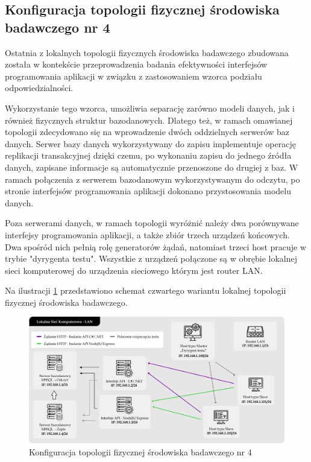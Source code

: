 \subsection*{Konfiguracja topologii fizycznej środowiska badawczego nr 4}
\label{sec:lokalne-srodowisko-badawcze-ver-4}
Ostatnia z lokalnych topologii fizycznych środowiska badawczego zbudowana została w kontekście przeprowadzenia badania efektywności interfejsów programowania aplikacji w związku z zastosowaniem wzorca podziału odpowiedzialności.

Wykorzystanie tego wzorca, umożliwia separację zarówno modeli danych, jak i również fizycznych struktur bazodanowych. Dlatego też, w ramach omawianej topologii zdecydowano się na wprowadzenie dwóch oddzielnych serwerów baz danych. Serwer bazy danych wykorzystywany do zapisu implementuje operację replikacji transakcyjnej dzięki czemu, po wykonaniu zapisu do jednego źródła danych, zapisane informacje są automatycznie przenoszone do drugiej z baz. W ramach połączenia z serwerem bazodanowym wykorzystywanym do odczytu, po stronie interfejsów programowania aplikacji dokonano przystosowania modelu danych.

Poza serwerami danych, w ramach topologii wyróżnić należy dwa porównywane interfejsy programowania aplikacji, a także zbiór trzech urządzeń końcowych. Dwa spośród nich pełnią rolę generatorów żądań, natomiast trzeci host pracuje w trybie "dyrygenta testu". Wszystkie z urządzeń połączone są w obrębie lokalnej sieci komputerowej do urządzenia sieciowego którym jest router LAN.

Na ilustracji \ref{fig:topologia-5} przedstawiono schemat czwartego wariantu lokalnej topologii fizycznej środowiska badawczego.

\clearpage

\begin{figure}[ht]
    \centering
     \includegraphics[width=\linewidth]{rys04/topologia-5.png}
    \caption{Konfiguracja topologii fizycznej środowiska badawczego nr 4}
    \label{fig:topologia-5}
\end{figure}


